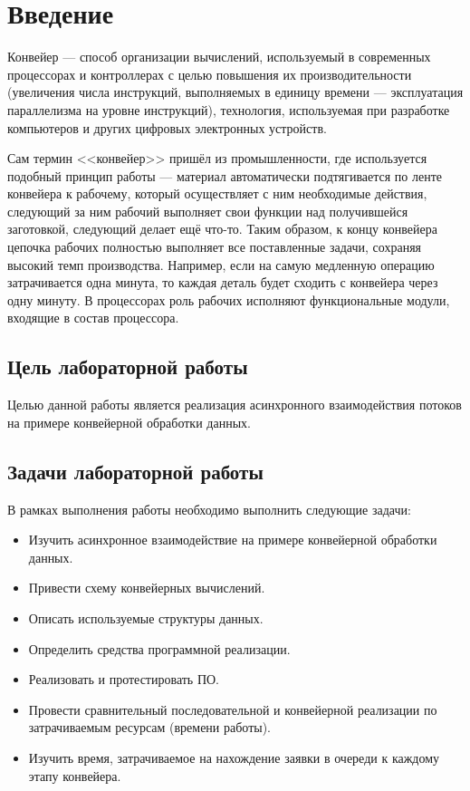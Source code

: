 \documentclass[12pt]{report}
\begin{document}
    
    \tableofcontents

    \newpage
    \chapter*{Введение}
    Конвейер — способ организации вычислений, используемый в современных процессорах и контроллерах с целью повышения их производительности (увеличения числа инструкций, выполняемых в единицу времени — эксплуатация параллелизма на уровне инструкций), технология, используемая при разработке компьютеров и других цифровых электронных устройств.
    
    Сам термин <<конвейер>> пришёл из промышленности, где используется подобный принцип работы — материал автоматически подтягивается по ленте конвейера к рабочему, который осуществляет с ним необходимые действия, следующий за ним рабочий выполняет свои функции над получившейся заготовкой, следующий делает ещё что-то. Таким образом, к концу конвейера цепочка рабочих полностью выполняет все поставленные задачи, сохраняя высокий темп производства. Например, если на самую медленную операцию затрачивается одна минута, то каждая деталь будет сходить с конвейера через одну минуту. В процессорах роль рабочих исполняют функциональные модули, входящие в состав процессора.
    
    \section*{Цель лабораторной работы}
    Целью данной работы является реализация асинхронного взаимодействия потоков на примере конвейерной обработки данных.
    
    \section*{Задачи лабораторной работы}
    
   В рамках выполнения работы необходимо выполнить следующие задачи:
    \begin{itemize}
    	\item Изучить асинхронное взаимодействие на примере конвейерной обработки данных.
    	\item Привести схему конвейерных вычислений.
    	\item Описать используемые структуры данных.
    	\item Определить средства программной реализации.
    	\item Реализовать и протестировать ПО.
    	\item Провести сравнительный последовательной и конвейерной реализации по затрачиваемым ресурсам (времени работы).
    	\item Изучить время, затрачиваемое на нахождение заявки в очереди к каждому этапу конвейера.
    \end{itemize}
    \newpage
    
\end{document}
